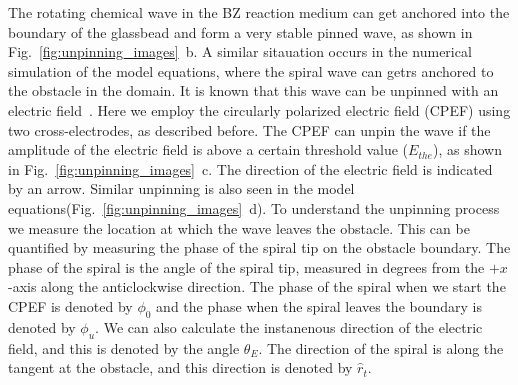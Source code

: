 The rotating chemical wave in the BZ reaction medium can get anchored into the
boundary of the glassbead and form a very stable pinned wave, as shown in
Fig.~\ref{fig:unpinning_images}~b.  A similar sitauation occurs in the
numerical simulation of the model equations, where the spiral wave can getrs
anchored to the obstacle in the domain. It is known that this wave can be
unpinned with an electric field~\cite{Amrutha,???}. 
Here we employ the circularly polarized electric field (CPEF) using two
cross-electrodes, as described before. The CPEF can unpin the wave if the
amplitude of the electric field is above a certain threshold value ($E_{the}$),
as shown in Fig.~\ref{fig:unpinning_images}~c.  The direction of the electric
field is indicated by an arrow. Similar unpinning
is also seen in the model equations(Fig.~\ref{fig:unpinning_images}~d). To
understand the unpinning process we measure the location at which the wave
leaves the obstacle. This can be quantified by measuring the phase of the
spiral tip on the obstacle boundary. The phase of the spiral is the angle of
the spiral tip, measured in degrees from the $+x$-axis along the anticlockwise
direction. The phase of the spiral when we start the CPEF is denoted by
$\phi_0$ and the phase when the spiral leaves the boundary is denoted by
$\phi_u$. We can also calculate the instanenous direction of the electric
field, and this is denoted by the angle $\theta_E$. The direction of the spiral
is along the tangent at the obstacle, and this direction is denoted by
${\hat{r}}_{t}$.  


